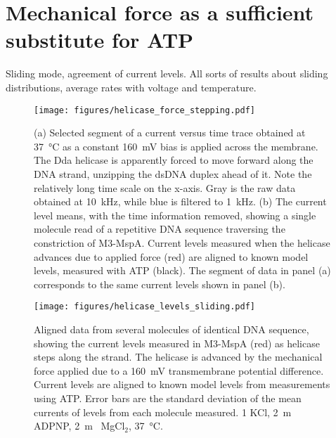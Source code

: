 \section{Mechanical force as a sufficient substitute for ATP}

Sliding mode, agreement of current levels.  All sorts of results about sliding distributions, average rates with voltage and temperature.

\begin{figure}[h]
\begin{centering}
\texttt{[image: figures/helicase\_force\_stepping.pdf]}
\caption[Mechanical force substitutes for ATP and moves helicase]{(a) Selected segment of a current versus time trace obtained at \SI{37}{\celsius} as a constant \SI{160}{\mV} bias is applied across the membrane.  The Dda helicase is apparently forced to move forward along the DNA strand, unzipping the dsDNA duplex ahead of it.  Note the relatively long time scale on the x-axis.  Gray is the raw data obtained at \SI{10}{\kHz}, while blue is filtered to \SI{1}{\kHz}.  (b) The current level means, with the time information removed, showing a single molecule read of a repetitive DNA sequence traversing the constriction of M3-MspA.  Current levels measured when the helicase advances due to applied force (red) are aligned to known model levels, measured with ATP (black).  The segment of data in panel (a) corresponds to the same current levels shown in panel (b).}
\label{fig:helicase_force_stepping}
\end{centering}
\end{figure}

\begin{figure}[h]
\begin{centering}
\texttt{[image: figures/helicase\_levels\_sliding.pdf]}
\caption[Mechanical force results in the same current levels]{Aligned data from several molecules of identical DNA sequence, showing the current levels measured in M3-MspA (red) as helicase steps along the strand.  The helicase is advanced by the mechanical force applied due to a \SI{160}{\mV} transmembrane potential difference.  Current levels are aligned to known model levels from measurements using ATP.  Error bars are the standard deviation of the mean currents of levels from each molecule measured.  \SI{1}{\Molar} KCl, \SI{2}{\m\Molar} ADPNP, \SI{2}{\m\Molar} MgCl$_2$, \SI{37}{\celsius}.}
\label{fig:helicase_force_stepping_2}
\end{centering}
\end{figure}

